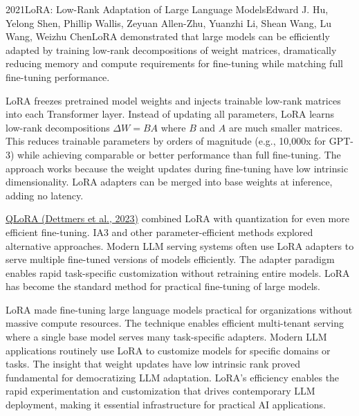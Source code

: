 
\begin{papersummary}{2021}{LoRA: Low-Rank Adaptation of Large Language Models}{Edward J. Hu, Yelong Shen, Phillip Wallis, Zeyuan Allen-Zhu, Yuanzhi Li, Shean Wang, Lu Wang, Weizhu Chen}{LoRA demonstrated that large models can be efficiently adapted by training low-rank decompositions of weight matrices, dramatically reducing memory and compute requirements for fine-tuning while matching full fine-tuning performance.}

LoRA freezes pretrained model weights and injects trainable low-rank matrices into each Transformer layer. Instead of updating all parameters, LoRA learns low-rank decompositions $\Delta W = BA$ where $B$ and $A$ are much smaller matrices. This reduces trainable parameters by orders of magnitude (e.g., 10,000x for GPT-3) while achieving comparable or better performance than full fine-tuning. The approach works because the weight updates during fine-tuning have low intrinsic dimensionality. LoRA adapters can be merged into base weights at inference, adding no latency.

\hyperref[paper:dettmers-2023-qlora]{QLoRA (Dettmers et al., 2023)} combined LoRA with quantization for even more efficient fine-tuning. IA3 and other parameter-efficient methods explored alternative approaches. Modern LLM serving systems often use LoRA adapters to serve multiple fine-tuned versions of models efficiently. The adapter paradigm enables rapid task-specific customization without retraining entire models. LoRA has become the standard method for practical fine-tuning of large models.

LoRA made fine-tuning large language models practical for organizations without massive compute resources. The technique enables efficient multi-tenant serving where a single base model serves many task-specific adapters. Modern LLM applications routinely use LoRA to customize models for specific domains or tasks. The insight that weight updates have low intrinsic rank proved fundamental for democratizing LLM adaptation. LoRA's efficiency enables the rapid experimentation and customization that drives contemporary LLM deployment, making it essential infrastructure for practical AI applications.

\end{papersummary}
